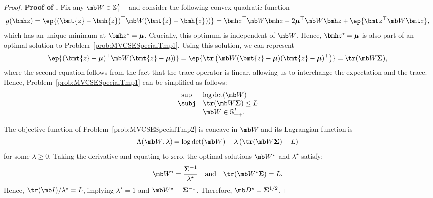 \documentclass[opre, blindrev]{informs4}
\newcommand{\1}[1]{\mathds{1}{\left(#1\right)}}
\begin{document}
\begin{appendices}
\begin{proof}{\bf Proof of .}
Fix any ${\mb W} \in \mathbb{S}^L_{++}$ and consider the following convex quadratic function
$$
g(\bmh z) = \ep{ (\bmt{z} - \bmh{z} )^\top {\mb W} (\bmt{z} - \bmh{z} ))} = \bmh z^\top \mb W \bmh z - 2 \bm \mu^\top \mb W \bmh z + \ep{\bmt z^\top \mb W \bmt z},
$$
which has an unique minimum at $\bmh z^\star = \bm \mu$. Crucially, this optimum is independent of $\mb W$. Hence, $\bmh z^\star = \bm \mu$ is also part of an optimal solution to Problem~\eqref{prob:MVCSESpecialTmp1}. Using this solution, we can represent 
$$
\ep{(\bmt{z} - \bm{\mu})^\top {\mb W} (\bmt{z} - \bm{\mu}))} = \ep{\tr\left(  {\mb W} (\bmt{z} - \bm \mu )(\bmt{z} - \bm \mu )^\top\right)} = \tr(\mb W \bm \Sigma), 
$$
where the second equation follows from the fact that the trace operator is linear, allowing us to interchange the expectation and the trace.
Hence, Problem~\eqref{prob:MVCSESpecialTmp1} can be simplified as follows:
\begin{equation}
\label{prob:MVCSESpecialTmp2}
\begin{array}{cll}
\sup & \displaystyle\log\det({\mb W}) \\
\subj & \displaystyle\displaystyle \tr(\mb W \bm \Sigma) \leq L \\
& \displaystyle{\mb W} \in \mathbb{S}^L_{++}.
\end{array}  
\end{equation}

The objective function of Problem~\eqref{prob:MVCSESpecialTmp2} is concave in ${\mb W}$ and its Lagrangian function is
$$
\Lambda({\mb W},\lambda) = \log\det(\mb W) - \lambda \left(\tr( \mb W \bm \Sigma) - L\right)
$$
for some $\lambda \geq 0$. Taking the derivative and equating to zero, the optimal solutions $\mb W^\star$ and $\lambda^\star$ satisfy:
\[
\mb W^\star = \frac{\bm \Sigma^{-1}}{\lambda^\star}
~~~\text{and}~~~
\tr( \mb W^\star \bm \Sigma) = L.
\]
Hence, $\tr(\mb I)/\lambda^\star = L$, implying $\lambda^\star=1$ and $\mb W^\star = \bm \Sigma^{-1}$. Therefore, $\mb D^\star = \bm \Sigma^{1/2}$.
\hfill \Halmos
\end{proof}
\vspace{3mm}


\end{appendices}
\end{document}
